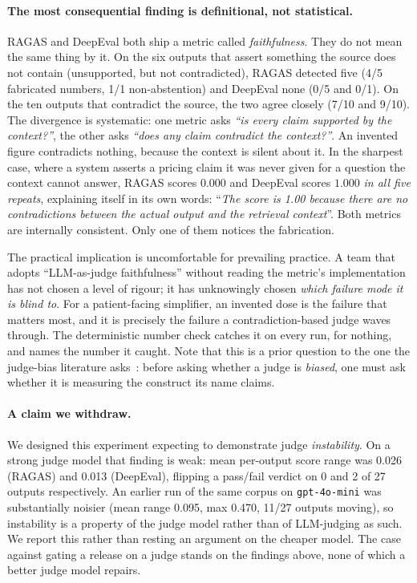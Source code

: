\documentclass[11pt,a4paper]{article}
\begin{document}
\paragraph{The most consequential finding is definitional, not statistical.}
RAGAS and DeepEval both ship a metric called \emph{faithfulness}. They do not mean the same thing by
it. On the six outputs that assert something the source does not contain (unsupported, but not
contradicted), RAGAS detected five (4/5 fabricated numbers, 1/1 non-abstention) and DeepEval none
(0/5 and 0/1). On the ten outputs that contradict the source, the two agree closely (7/10
and 9/10). The divergence is systematic: one metric asks \emph{``is every claim supported by the
context?''}, the other asks \emph{``does any claim contradict the context?''}. An invented figure
contradicts nothing, because the context is silent about it. In the sharpest case, where a system asserts
a pricing claim it was never given for a question the context cannot answer, RAGAS scores $0.000$ and DeepEval scores $\mathbf{1.000}$ \emph{in all five repeats}, explaining itself in its own
words: ``\emph{The score is 1.00 because there are no contradictions between the actual output and the
retrieval context}''. Both metrics are internally consistent. Only one of them notices the fabrication.

The practical implication is uncomfortable for prevailing practice. A team that adopts
``LLM-as-judge faithfulness'' without reading the metric's implementation has not chosen a level of
rigour; it has unknowingly chosen \emph{which failure mode it is blind to}. For a patient-facing
simplifier, an invented dose is the failure that matters most, and it is precisely the failure a
contradiction-based judge waves through. The deterministic number check catches it on every run, for
nothing, and names the number it caught. Note that this is a prior question to the one the judge-bias
literature asks~\cite{wang2024unfair,panickssery2024selfpref,koo2024biases}: before asking whether a
judge is \emph{biased}, one must ask whether it is measuring the construct its name claims.

\paragraph{A claim we withdraw.}
We designed this experiment expecting to demonstrate judge \emph{instability}. On a strong judge model
that finding is weak: mean per-output score range was 0.026 (RAGAS) and 0.013 (DeepEval), flipping a
pass/fail verdict on 0 and 2 of 27 outputs respectively. An earlier run of the same corpus on
\texttt{gpt-4o-mini} was substantially noisier (mean range 0.095, max 0.470, 11/27 outputs moving), so
instability is a property of the judge model rather than of LLM-judging as such. We report this rather
than resting an argument on the cheaper model. The case against gating a release on a judge stands on
the findings above, none of which a better judge model repairs.
\end{document}
